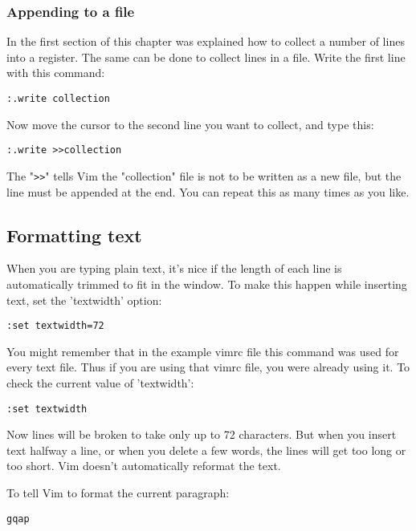 \subsubsection{Appending to a file}
In the first section of this chapter was explained how to collect a number of lines into a register.
The same can be done to collect lines in a file.
Write the first line with this command:

\begin{Verbatim}[samepage=true]
 :.write collection
\end{Verbatim}

Now move the cursor to the second line you want to collect, and type this:

\begin{Verbatim}[samepage=true]
 :.write >>collection
\end{Verbatim}

The "\verb!>>!" tells Vim the "collection" file is not to be written as a new file, but the line must be appended at the end.
You can repeat this as many times as you like.
\subsection{Formatting text}
When you are typing plain text, it's nice if the length of each line is automatically trimmed to fit in the window.
To make this happen while inserting text, set the 'textwidth' option:

\begin{Verbatim}[samepage=true]
 :set textwidth=72
\end{Verbatim}

You might remember that in the example vimrc file this command was used for every text file.
Thus if you are using that vimrc file, you were already using it.
To check the current value of 'textwidth':

\begin{Verbatim}[samepage=true]
 :set textwidth
\end{Verbatim}

Now lines will be broken to take only up to 72 characters.
But when you insert text halfway a line, or when you delete a few words, the lines will get too long or too short.
Vim doesn't automatically reformat the text.

To tell Vim to format the current paragraph:

\begin{Verbatim}[samepage=true]
 gqap
\end{Verbatim}

